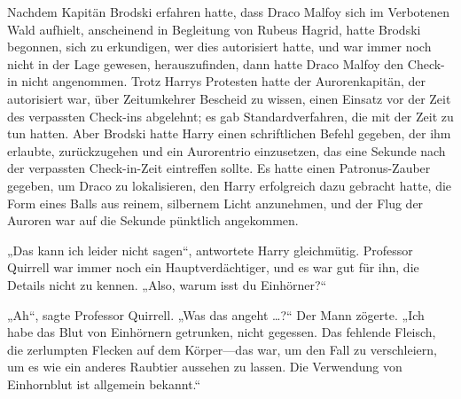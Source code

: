Nachdem Kapitän Brodski erfahren hatte, dass Draco Malfoy sich im Verbotenen Wald aufhielt, anscheinend in Begleitung von Rubeus Hagrid, hatte Brodski begonnen, sich zu erkundigen, wer dies autorisiert hatte, und war immer noch nicht in der Lage gewesen, herauszufinden, dann hatte Draco Malfoy den Check-in nicht angenommen. Trotz Harrys Protesten hatte der Aurorenkapitän, der autorisiert war, über Zeitumkehrer Bescheid zu wissen, einen Einsatz vor der Zeit des verpassten Check-ins abgelehnt; es gab Standardverfahren, die mit der Zeit zu tun hatten. Aber Brodski hatte Harry einen schriftlichen Befehl gegeben, der ihm erlaubte, zurückzugehen und ein Aurorentrio einzusetzen, das eine Sekunde nach der verpassten Check-in-Zeit eintreffen sollte. Es hatte einen Patronus-Zauber gegeben, um Draco zu lokalisieren, den Harry erfolgreich dazu gebracht hatte, die Form eines Balls aus reinem, silbernem Licht anzunehmen, und der Flug der Auroren war auf die Sekunde pünktlich angekommen.

„Das kann ich leider nicht sagen“, antwortete Harry gleichmütig. Professor Quirrell war immer noch ein Hauptverdächtiger, und es war gut für ihn, die Details nicht zu kennen. „Also, warum isst du Einhörner?“

„Ah“, sagte Professor Quirrell. „Was das angeht …?“ Der Mann zögerte. „Ich habe das Blut von Einhörnern getrunken, nicht gegessen. Das fehlende Fleisch, die zerlumpten Flecken auf dem Körper—das war, um den Fall zu verschleiern, um es wie ein anderes Raubtier aussehen zu lassen. Die Verwendung von Einhornblut ist allgemein bekannt.“

